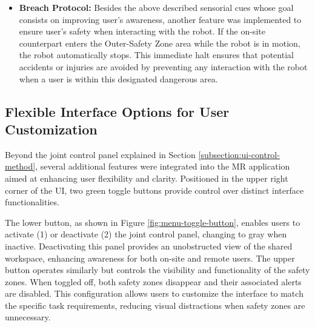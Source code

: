 \begin{itemize}
\item \textbf{Breach Protocol:} Besides the above described sensorial cues whose goal consists on improving user's awareness, another feature was implemented to ensure user's safety when interacting with the robot. If the on-site counterpart enters the Outer-Safety Zone area while the robot is in motion, the robot automatically stops. This immediate halt ensures that potential accidents or injuries are avoided by preventing any interaction with the robot when a user is within this designated dangerous area.
\end{itemize}
    
\subsection{Flexible Interface Options for User Customization}


Beyond the joint control panel explained in Section \ref{subsection:ui-control-method}, several additional features were integrated into the \ac{MR} application aimed at enhancing user flexibility and clarity. Positioned in the upper right corner of the \ac{UI}, two green toggle buttons provide control over distinct interface functionalities.

The lower button, as shown in Figure \ref{fig:menu-toggle-button}, enables users to activate (1) or deactivate (2) the joint control panel, changing to gray when inactive. Deactivating this panel provides an unobstructed view of the shared workspace, enhancing awareness for both on-site and remote users. The upper button operates similarly but controls the visibility and functionality of the safety zones. When toggled off, both safety zones disappear and their associated alerts are disabled. This configuration allows users to customize the interface to match the specific task requirements, reducing visual distractions when safety zones are unnecessary.

